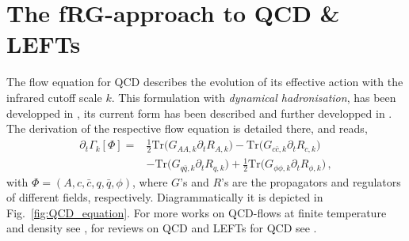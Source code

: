 \documentclass[%
reprint,
superscriptaddress,
showpacs,preprintnumbers,
amsmath,amssymb,
aps,
prd,
]{revtex4-1}
\def\Fig#1{Fig.~\ref{#1}} \def\Tab#1{Tab.~\ref{#1}}
\begin{document}
	
\appendix
	
\section{The fRG-approach to QCD \& LEFTs}\label{app:fRG}
	
The flow equation for QCD describes the evolution of its effective action with the infrared cutoff scale $k$. This formulation with \textit{dynamical hadronisation}, \cite{Gies:2001nw, Gies:2002hq, Pawlowski:2005xe, Floerchinger:2009uf, Fu:2019hdw} has been developped in \cite{Mitter:2014wpa,Braun:2014ata,Cyrol:2017ewj,Fu:2019hdw}, its current form has been described and further developped in \cite{Fu:2019hdw}. The derivation of the respective flow equation is detailed there, and reads, 
	\begin{align}
		\partial_t\Gamma_k[\Phi]=&\frac{1}{2}\mathrm{Tr}\Big(G_{AA,k}\partial_t R_{A,k}\Big)-\mathrm{Tr}\Big(G_{c\bar c,k}\partial_t R_{c,k}\Big)\nonumber\\[2ex]
		&-\mathrm{Tr}\Big(G_{q\bar q,k}\partial_t R_{q,k}\Big)+\frac{1}{2}\mathrm{Tr}\Big(G_{\phi\phi,k}\partial_t R_{\phi,k}\Big)\,,\label{eq:QCDflow}
	\end{align}
	with $\Phi=(A, c, \bar c, q,\bar q,\phi)$, where $G$'s and $R$'s are the propagators and regulators of different fields, respectively. Diagrammatically it is depicted in \Fig{fig:QCD_equation}. For more works on QCD-flows at finite temperature and density see \cite{Braun:2007bx,Braun:2008pi,Braun:2009gm,Mitter:2014wpa,Braun:2014ata,Cyrol:2016tym,Cyrol:2017ewj,Cyrol:2017qkl,Fu:2019hdw,Braun:2020ada}, for reviews on QCD and LEFTs for QCD see    \cite{Berges:2000ew,Pawlowski:2005xe,Schaefer:2006sr,Gies:2006wv,Rosten:2010vm,Braun:2011pp,Pawlowski:2014aha,Dupuis:2020fhh}.
	
\end{document}
